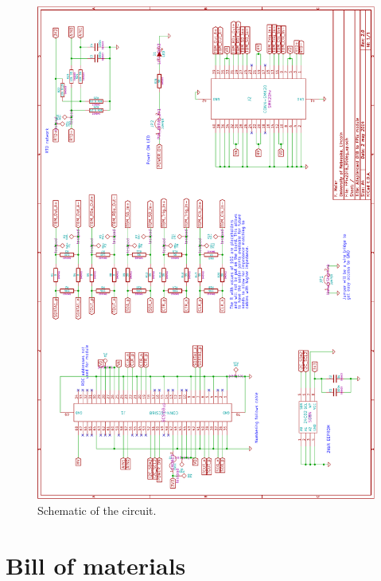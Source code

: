 \begin{figure}[hbtp]
	\begin{center}
	\includegraphics[width=1.0\textwidth]{img/FPix2DTB_90degSchematic.pdf}
	\end{center}
	\caption{Schematic of the circuit.}
	\label{fig:FPix2DTB_90degSchematic}
\end{figure}

\section{Bill of materials}


